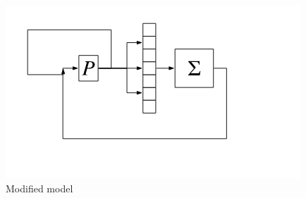 \documentclass{article}
\begin{document}
  \begin{figure}[h!]
    \centering
    \includegraphics[scale=0.5]{./Data/modifiedmodel.png}
    \caption{Modified model}
  \end{figure} 
\end{document}
